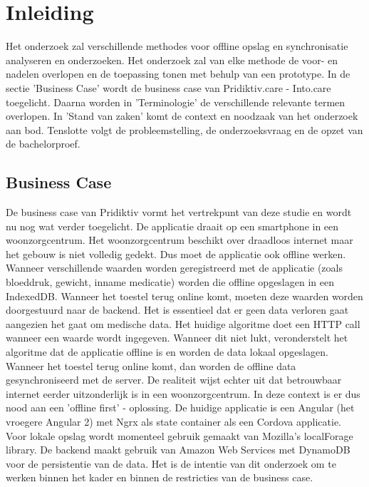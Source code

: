 \chapter{Inleiding}
\label{ch:inleiding}
Het onderzoek zal verschillende methodes voor offline opslag en synchronisatie analyseren en onderzoeken. Het onderzoek zal van elke methode de voor- en nadelen overlopen en de toepassing tonen met behulp van een prototype. In de sectie 'Business Case' wordt de business case van Pridiktiv.care - Into.care toegelicht. Daarna worden in 'Terminologie' de verschillende relevante termen overlopen. In 'Stand van zaken' komt de context en noodzaak van het onderzoek aan bod. Tenslotte volgt de probleemstelling, de onderzoeksvraag en de opzet van de bachelorproef.
\section{Business Case}
\label{sec:business-case}
De business case van Pridiktiv vormt het vertrekpunt van deze studie en wordt nu nog wat verder toegelicht. De applicatie draait op een smartphone in een woonzorgcentrum. Het woonzorgcentrum beschikt over draadloos internet maar het gebouw is niet volledig gedekt. Dus moet de applicatie ook offline werken. Wanneer verschillende waarden worden geregistreerd met de applicatie (zoals bloeddruk, gewicht, inname medicatie) worden die offline opgeslagen in een IndexedDB. Wanneer het toestel terug online komt, moeten deze waarden worden doorgestuurd naar de backend. Het is essentieel dat er geen data verloren gaat aangezien het gaat om medische data. Het huidige algoritme doet een HTTP call wanneer een waarde wordt ingegeven. Wanneer dit niet lukt, veronderstelt het algoritme dat de applicatie offline is en worden de data lokaal opgeslagen. Wanneer het toestel terug online komt, dan worden de offline data gesynchroniseerd met de server. De realiteit wijst echter uit dat betrouwbaar internet eerder uitzonderlijk is in een woonzorgcentrum. In deze context is er dus nood aan een 'offline first' -  oplossing. De huidige applicatie is een Angular (het vroegere Angular 2) met Ngrx als state container als een Cordova applicatie. Voor lokale opslag wordt momenteel gebruik gemaakt van Mozilla's localForage library. De backend maakt gebruik van Amazon Web Services met DynamoDB voor de persistentie van de data. Het is de intentie van dit onderzoek om te werken binnen het kader en binnen de restricties van de business case.
